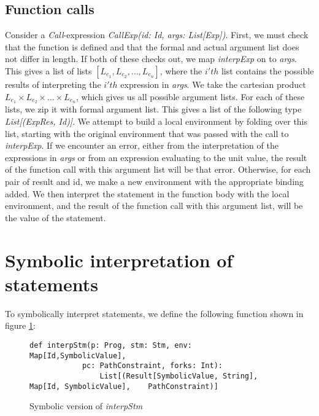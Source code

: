 \subsection{Function calls}
Consider a \textsl{Call}-expression \textsl{CallExp(id: Id, args: List[Exp])}.
First, we must check that the function is defined and that the formal and actual argument list does not differ in length. If both of these checks out, we map \textsl{interpExp} on to \textsl{args}. This gives a list of lists $[L_{e_1}, L_{e_2}, \ldots, L_{e_n}]$, where the $i'th$ list contains the possible results of interpreting the $i'th$ expression in \textsl{args}.
We take the cartesian product $L_{e_1} \times L_{e_2} \times \ldots \times L_{e_n}$, which gives us all possible argument lists. For each of these lists, we zip it with formal argument list. This gives a list of the following type \textsl{List[(ExpRes, Id)]}. We attempt to build a local environment by folding over this list, starting with the original environment that was passed with the call to \textsl{interpExp}. If we encounter an error, either from the interpretation of the expressions in \textsl{args} or from an expression evaluating to the unit value, the result of the function call with this argument list will be that error. Otherwise, for each pair of result and id, we make a new environment with the appropriate binding added. We then interpret the statement in the function body  with the local environment, and the result of the function call with this argument list, will be the value of the statement. 

\section{Symbolic interpretation of statements}

To symbolically interpret statements, we define the following function shown in figure \ref{interpStmSymbolic}:

\begin{figure}[!h]
	\begin{lstlisting}[style=simple]
		def interpStm(p: Prog, stm: Stm, env: Map[Id,SymbolicValue], 
			pc: PathConstraint, forks: Int): 
				List[(Result[SymbolicValue, String], Map[Id, SymbolicValue], 	PathConstraint)]
	\end{lstlisting}
	\caption{Symbolic version of \textsl{interpStm}}
	\label{interpStmSymbolic}
\end{figure}


